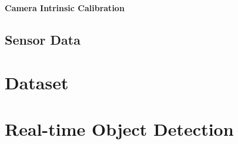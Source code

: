 \documentclass{erauthesis}
\begin{document}
\subsubsection{Camera Intrinsic Calibration} \label{HDR_intrinsic}

\section{Sensor Data} \label{sensor_data}





\chapter{Dataset} \label{dataset}

\chapter{Real-time Object Detection} \label{object-detection}
\end{document}
